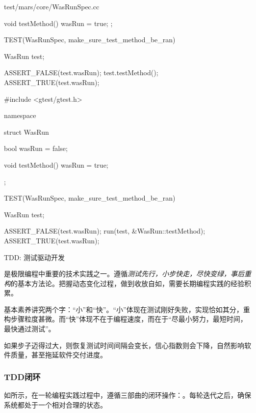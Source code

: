 \begin{content}
\begin{diff}{test/mars/core/WasRunSpec.cc}
\begin{minicpp}
{{    void testMethod() {
      wasRun = true;
    }
  };
}

TEST(WasRunSpec, make_sure_test_method_be_ran) {
  WasRun test;

  ASSERT_FALSE(test.wasRun);
  test.testMethod();
  ASSERT_TRUE(test.wasRun);
}
\end{minicpp}
\tcblower
\begin{minicpp}
#include <gtest/gtest.h>

namespace {
  struct WasRun {
    bool wasRun = false;

    void testMethod() {
      wasRun = true;
    }
  };
}

TEST(WasRunSpec, make_sure_test_method_be_ran) {
  WasRun test;

  ASSERT_FALSE(test.wasRun);
  run(test, &WasRun::testMethod);
  ASSERT_TRUE(test.wasRun);
}
\end{minicpp}
\end{diff}

\begin{episode}{TDD: 测试驱动开发}

\begin{content}

是极限编程中重要的技术实践之一。遵循\emph{测试先行，小步快走，尽快变绿，事后重构}的基本方法论。把握动态变化过程，做到收放自如，需要长期编程实践的经验积累。

基本素养讲究两个字：“小”和“快”。“小”体现在测试刚好失败，实现恰如其分，重构步骤粒度甚微。而“快”体现不在于编程速度，而在于“尽最小努力，最短时间，最快通过测试”。

如果步子迈得过大，则恢复测试时间间隔会变长，信心指数则会下降，自然影响软件质量，甚至拖延软件交付进度。

\subsubsection{TDD闭环}

如所示，在一轮编程实践过程中，遵循三部曲的闭环操作：。每轮迭代之后，确保系统都处于一个相对合理的状态。


\end{content}
\end{episode}
\end{content}
